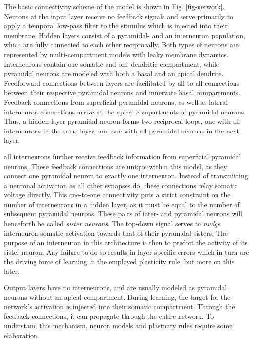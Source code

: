 
The basic connectivity scheme of the model is shown in Fig. \ref{fig-network}. Neurons at the input layer receive no
feedback signals and serve primarily to apply a temporal low-pass filter to the stimulus which is injected into their
membrane.  Hidden layers consist of a pyramidal- and an interneuron population, which are fully connected to each other
reciprocally. Both types of neurons are represented by multi-compartment models with leaky membrane dynamics.
Interneurons contain one somatic and one dendritic compartment, while pyramidal neurons are modeled with both a basal
and an apical dendrite.  Feedforward connections between layers are facilitated by all-to-all connections between their
respective pyramidal neurons and innervate basal compartments. Feedback connections from superficial pyramidal neurons,
as well as lateral interneuron connections arrive at the apical compartments of pyramidal neurons. Thus, a hidden layer
pyramidal neuron forms two reciprocal loops, one with all interneurons in the same layer, and one with all pyramidal
neurons in the next layer.

all interneurons further receive feedback information from superficial pyramidal neurons. These feedback connections are
unique within this model, as they connect one pyramidal neuron to exactly one interneuron. Instead of transmitting a
neuronal activation as all other synapses do, these connections relay somatic voltage directly. This one-to-one
connectivity puts a strict constraint on the number of interneurons in a hidden layer, as it must be equal to the number
of subsequent pyramidal neurons. These pairs of inter- and pyramidal neurons will henceforth be called \textit{sister
neurons}. The top-down signal serves to \textit{nudge} interneuron somatic activation towards that of their pyramidal
sisters. The purpose of an interneuron in this architecture is then to predict the activity of its sister neuron. Any
failure to do so results in layer-specific errors which in turn are the driving force of learning in the employed
plasticity rule, but more on this later.

Output layers have no interneurons, and are usually modeled as pyramidal neurons without an apical compartment. During
learning, the target for the network's activation is injected into their somatic compartment. Through the feedback
connections, it can propagate through the entire network. To understand this mechanism, neuron models and plasticity
rules require some elaboration.


